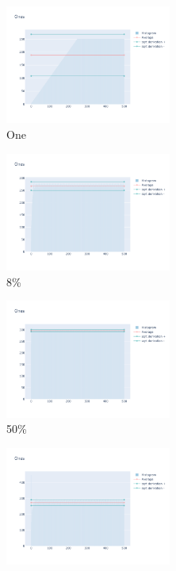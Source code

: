 \documentclass[12pt, fleqn]{report}                             %
\theoremstyle{break}                                            %
\begin{document}
      \begin{figure}[ht!]
        \centering
        \begin{subfigure}[b]{0.4\linewidth}
          \includegraphics[width=0.6\textwidth]{Images/94/dia-a.png}
          \caption{One}
        \end{subfigure}
        \begin{subfigure}[b]{0.4\linewidth}
          \includegraphics[width=0.6\textwidth]{Images/94/dia-b.png}
          \caption{8\%}
        \end{subfigure}
        \begin{subfigure}[b]{0.4\linewidth}
          \includegraphics[width=0.6\textwidth]{Images/94/dia-c.png}
          \caption{50\%}
        \end{subfigure}
        \begin{subfigure}[b]{0.4\linewidth}
          \includegraphics[width=0.6\textwidth]{Images/94/dia-d.png}

\end{subfigure}
\end{figure}
\end{document}
